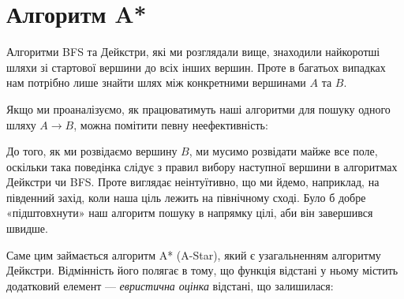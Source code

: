 \documentclass[12pt,a4paper]{report}
\begin{document}
\section{Алгоритм A*}

Алгоритми BFS та Дейкстри, які ми розглядали вище, знаходили найкоротші шляхи зі стартової вершини до всіх інших вершин. Проте в багатьох випадках нам потрібно лише знайти шлях між конкретними вершинами \(A\) та \(B\).

Якщо ми проаналізуємо, як працюватимуть наші алгоритми для пошуку одного шляху \(A \rightarrow B\), можна помітити певну неефективність:

\begin{center}
\end{center}

До того, як ми розвідаємо вершину \(B\), ми мусимо розвідати майже все поле, оскільки така поведінка слідує з правил вибору наступної вершини в алгоритмах Дейкстри чи BFS.
Проте виглядає неінтуїтивно, що ми йдемо, наприклад, на південний захід, коли наша ціль лежить на північному сході. Було б добре «підштовхнути» наш алгоритм пошуку в напрямку цілі, аби він завершився швидше.

Саме цим займається алгоритм A* (A-Star), який є узагальненням алгоритму Дейкстри. Відмінність його полягає в тому, що функція відстані у ньому містить додатковий елемент --- \emph{евристична оцінка} відстані, що залишилася:
\end{document}
